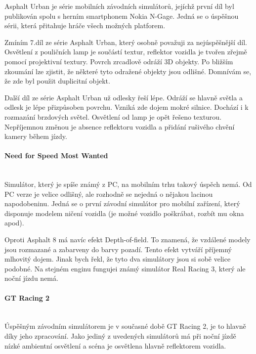 \documentclass[11pt,twoside,a4paper]{book}
\begin{document}
Asphalt Urban je série mobilních závodních simulátorů, jejíchž první díl byl publikován spolu s herním smartphonem Nokia N-Gage. Jedná se o úspěšnou sérii, která přitahuje hráče všech možných platforem.

Zmíním 7.díl ze série Asphalt Urban, který osobně považuji za nejúspěšnější díl. Osvětlení z pouličních lamp je součástí textur, reflektor vozidla je tvořen zřejmě pomocí projektivní textury. Povrch zrcadlově odráží 3D objekty. Po bližším zkoumání lze zjistit, že některé tyto odražené objekty jsou odlišné. Domnívám se, že zde byl použit duplicitní objekt.

Další díl ze série Asphalt Urban už odlesky řeší lépe. Odráží se hlavně světla a odlesk je lépe přizpůsoben povrchu. Vzniká zde dojem mokré silnice. Dochází i k rozmazání brzdových světel. Osvětlení od lamp je opět řešeno texturou. Nepříjemnou změnou je absence reflektoru vozidla a přidání rušivého chvění kamery během jízdy.

\paragraph{Need for Speed Most Wanted}\mbox{}\\

Simulátor, který je spíše známý z PC, na mobilním trhu takový úspěch nemá. Od PC verze je velice odlišný, ale rozhodně se nejedná o nějakou lacinou napodobeninu. Jedná se o první závodní simulátor pro mobilní zařízení, který disponuje modelem ničení vozidla (je možné vozidlo poškrábat, rozbít mu okna apod).

Oproti Asphalt 8 má navíc efekt Depth-of-field. To znamená, že vzdálené modely jsou rozmazané a zabarveny do barvy pozadí. Tento efekt vytváří příjemný mlhovitý dojem. Jinak bych řekl, že tyto dva simulátory jsou si sobě velice podobné. Na stejném enginu funguje\linebreak i známý simulátor Real Racing 3, který ale noční jízdu nemá.

\paragraph{GT Racing 2}\mbox{}\\

Úspěšným závodním simulátorem je v současné době GT Racing 2, je to hlavně díky jeho zpracování. Jako jediný z uvedených simulátorů má při noční jízdě nízké ambientní osvětlení a scéna je osvětlena hlavně reflektorem vozidla.
\end{document}
